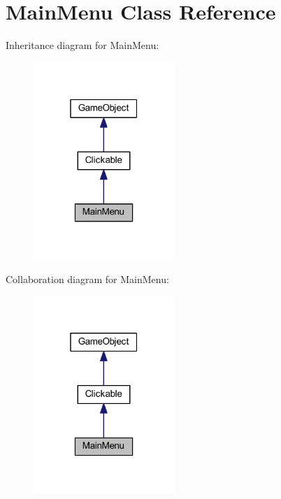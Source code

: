 \hypertarget{class_main_menu}{\section{Main\+Menu Class Reference}
\label{class_main_menu}
}


Inheritance diagram for Main\+Menu\+:\nopagebreak
\begin{figure}[H]
\begin{center}
\leavevmode
\includegraphics[width=151pt]{class_main_menu__inherit__graph}
\end{center}
\end{figure}


Collaboration diagram for Main\+Menu\+:\nopagebreak
\begin{figure}[H]
\begin{center}
\leavevmode
\includegraphics[width=151pt]{class_main_menu__coll__graph}
\end{center}
\end{figure}
